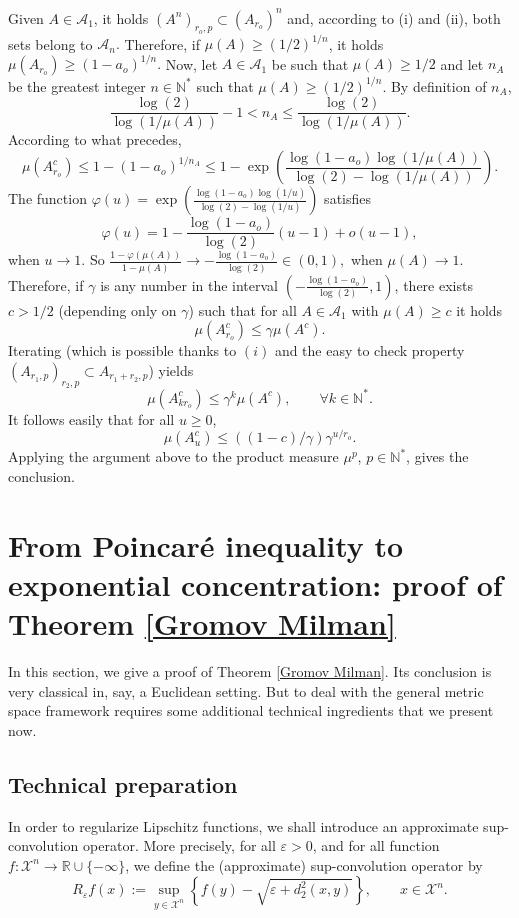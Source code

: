 \documentclass[11pt]{amsart}
\numberwithin{equation}{section}
\begin{document}
\proof
Given $A\in \mathcal{A}_1$, it holds $\left(A^n\right)_{r_o,p}\subset \left(A_{r_o}\right)^n$ and, according to (i) and (ii), both sets belong to $\mathcal{A}_n.$ Therefore, if $\mu(A)\geq (1/2)^{1/n}$, it holds $\mu(A_{r_o}) \geq (1-a_o )^{1/n}.$
Now, let $A\in \mathcal{A}_1$ be such that $\mu(A)\geq1/2$ and let $n_A$ be the greatest integer $n\in {\mathbb{N}}^*$ such that
$\mu(A)\geq (1/2)^{1/n}.$ By definition of $n_A$, 
\[
\frac{\log(2)}{\log(1/\mu(A))}-1< n_A\leq \frac{\log(2)}{\log(1/\mu(A))}.
\]
According to what precedes, 
\[
\mu(A_{r_o}^c)\leq 1-(1-a_o )^{1/n_A}\leq 1-\exp\left(\frac{\log(1-a_o )\log(1/\mu(A))}{\log(2)-\log(1/\mu(A))}\right).
\]
The function $\varphi(u)=\exp\left(\frac{\log(1-a_o )\log(1/u)}{\log(2)-\log(1/u)}\right)$ satisfies
\[
\varphi(u)=1-\frac{\log(1-a_o )}{\log(2)}(u-1)+o(u-1),
\]
when $u\to 1.$ So $\frac{1-\varphi(\mu(A))}{1-\mu(A)} \to -\frac{\log(1-a_o )}{\log(2)}\in (0,1),$ when $\mu(A)\to1.$ Therefore, if $\gamma$ is any number in the interval $(-\frac{\log(1-a_o )}{\log(2)},1)$, there exists $c>1/2$ (depending only on $\gamma$) such that for all $A \in \mathcal{A}_1$ with $\mu(A)\geq c$ it holds
\[
\mu(A_{r_o}^c)\leq \gamma \mu(A^c).\]
Iterating (which is possible thanks to $(i)$ and the easy to check property $\left(A_{r_1,p}\right)_{r_2,p}\subset A_{r_1+r_2,p}$) yields
\[
\mu(A_{kr_o}^c)\leq \gamma^k \mu(A^c),\qquad \forall k\in {\mathbb{N}}^*.
\]
It follows easily that for all $u\geq0$, 
\[
\mu(A_u^c)\leq ((1-c)/\gamma) \gamma^{u/r_o}.
\]
Applying the argument above to the product measure $\mu^p$, $p\in {\mathbb{N}}^*$, gives the conclusion.
\endproof

\section{ From Poincar\'e inequality to exponential concentration: proof of Theorem \ref{Gromov Milman}} \label{sec:gromov-milman}
In this section, we give a proof of Theorem \ref{Gromov Milman}. Its conclusion is very classical in, say, a Euclidean setting. But to deal with the general metric space framework requires some additional technical ingredients that we present now.

\subsection{Technical preparation}\label{sec:tec}

In order to regularize Lipschitz functions, we shall introduce an approximate sup-convolution operator. More precisely, for all $\varepsilon>0$, and for all function $f:{\mathcal{X}}^n\to {\mathbb{R}}\cup\{-\infty\}$, we define the (approximate) sup-convolution operator by
 \begin{equation} \label{defRt}
R_{\varepsilon} f(x):=\sup_{y\in {\mathcal{X}}^n}\left\{ f(y) -\sqrt{\varepsilon +d_2^2(x,y)} \right\},\qquad x\in {\mathcal{X}}^n .
 \end{equation}
\end{document}
